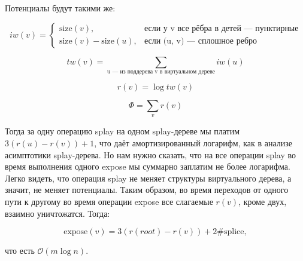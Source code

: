 Потенциалы будут такими же:

$$iw(v) = \begin{cases}
		 \text{size}(v), & \text{если у v все рёбра в детей --- пунктирные}\\
		 \text{size}(v) - \text{size}(u), & \text{если (u, v) --- сплошное ребро}
		 \end{cases}$$

$$tw(v) = \sum_{\text{u --- из поддерева v в виртуальном дереве}} iw(u)$$

$$r(v) = \log{tw(v)}$$

$$\Phi = \sum_v r(v)$$

Тогда за одну операцию splay на одном splay-дереве мы платим $3(r(u) - r(v)) + 1$, что даёт амортизированный логарифм, как в анализе асимптотики splay-дерева. Но нам нужно сказать, что на все операции splay во время выполнения одного expose мы суммарно заплатим не более логарифма. Легко видеть, что операция splay не меняет структуры виртуального дерева, а значит, не меняет потенциалы. Таким образом, во время переходов от одного пути к другому во время операции expose все слагаемые $r(v)$, кроме двух, взаимно уничтожатся.
Тогда:

$$\text{expose}(v) = 3(r(root) - r(v)) + 2 \# \text{splice},$$

что есть $\mathcal{O}(m \log{n})$.
